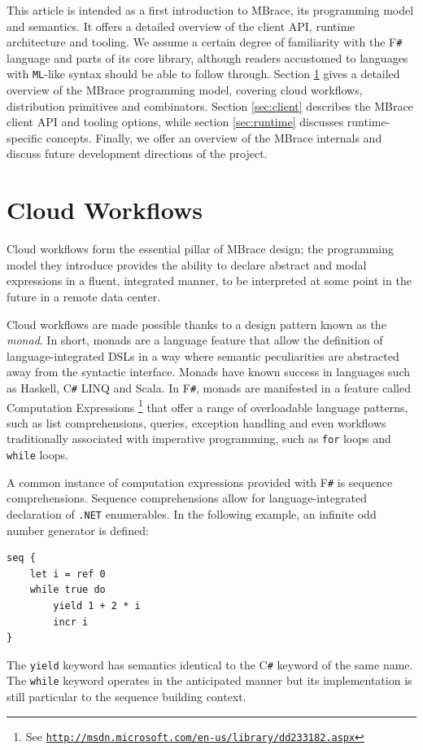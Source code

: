 \documentclass[9pt,a4paper]{article}
\newcommand{\mbrace}{MBrace}
\newcommand{\fsharp}{F\texttt \#}
\newcommand{\csharp}{C\texttt \#}
\newcommand{\dotnet}{\texttt{\hbox{.}NET}}
\newcommand{\samehref}[1]{\href{#1}{\texttt{#1}}}
\begin{document}
This article is intended as a first introduction to \mbrace{}, its programming model and semantics.
It offers a detailed overview of the client API, runtime architecture and tooling.
We assume a certain degree of familiarity with the \fsharp{} language and parts
of its core library, although readers accustomed to languages with \texttt{ML}-like syntax
should be able to follow through.
Section \ref{sec:workflows} gives a detailed overview of the \mbrace{} programming model,
covering cloud workflows, distribution primitives and combinators.
Section \ref{sec:client} describes the \mbrace{} client API and tooling options,
while section \ref{sec:runtime} discusses runtime-specific concepts.
Finally, we offer an overview of the \mbrace{} internals and discuss future
development directions of the project.
%


%
%

\section{Cloud Workflows}%
\label{sec:workflows}
%
Cloud workflows form the essential pillar of \mbrace{} design;
the programming model they introduce provides the ability to declare abstract
and modal expressions in a fluent, integrated manner, to be interpreted 
at some point in the future in a remote data center.

Cloud workflows are made possible thanks to a design pattern known as the \emph{monad}.
In short, monads are a language feature that allow the definition of language-integrated 
DSLs in a way where semantic peculiarities are abstracted away from the syntactic interface.
Monads have known success in languages such as Haskell, \csharp{} LINQ and Scala. 
In \fsharp, monads are manifested in a feature called 
Computation Expressions%
\footnote{See \samehref{http://msdn.microsoft.com/en-us/library/dd233182.aspx}}
that offer a range of overloadable language patterns, such as list comprehensions, 
queries, exception handling and even workflows traditionally associated with 
imperative programming, such as \texttt{for} loops and \texttt{while} loops.

A common instance of computation expressions provided with \fsharp{} is 
sequence comprehensions. Sequence comprehensions allow for language-integrated declaration 
of \dotnet{} enumerables. In the following example, an infinite odd number generator is 
defined:
\begin{lstlisting}
seq {
	let i = ref 0
	while true do
		yield 1 + 2 * i
		incr i
}
\end{lstlisting}
The \texttt{yield} keyword has semantics identical to the \csharp{} keyword of the same 
name. The \texttt{while} keyword operates in the anticipated manner but its implementation
is still particular to the sequence building context.
\end{document}
